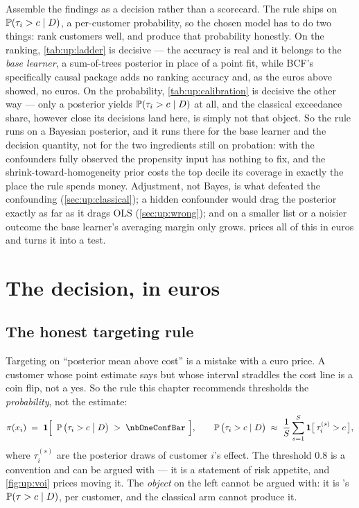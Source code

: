Assemble the findings as a decision rather than a scorecard. The rule ships on
$\operatorname{\mathbb{P}}(\tau_i > c \mid D)$, a per-customer probability, so the chosen model has to do two things:
rank customers well, and produce that probability honestly. On the ranking, \cref{tab:up:ladder} is
decisive --- the accuracy is real and it belongs to the \emph{base learner}, a sum-of-trees
posterior in place of a point fit, while BCF's specifically causal package adds no ranking accuracy
and, as the euros above showed, no euros. On the probability, \cref{tab:up:calibration} is decisive
the other way --- only a posterior yields $\operatorname{\mathbb{P}}(\tau_i > c \mid D)$ at all, and the classical
exceedance share, however close its decisions land here, is simply not that object. So the rule runs
on a Bayesian posterior, and it runs there for the base learner and the decision quantity, not for
the two ingredients still on probation: with the confounders fully observed the propensity input has
nothing to fix, and the shrink-toward-homogeneity prior costs the top decile its coverage in exactly
the place the rule spends money. Adjustment, not Bayes, is what defeated the confounding
(\cref{sec:up:classical}); a hidden confounder would drag the posterior exactly as far as it drags
OLS (\cref{sec:up:wrong}); and on a smaller list or a noisier outcome the base learner's averaging
margin only grows.  prices all of this in euros and turns it into a test.

\section{The decision, in euros}
\label{sec:up:euro}

\subsection*{The honest targeting rule}

Targeting on ``posterior mean above cost'' is a mistake with a euro price. A customer whose point
estimate says  but whose interval straddles the \eur{\nbOneCost} cost line is a coin flip,
not a yes. So the rule this chapter recommends thresholds the \emph{probability}, not the estimate:
%
\begin{equation}
  \pi(x_i) \;=\; \mathbf 1\Big[\ \Prob\big(\tau_i > c \;\big|\; D\big) \;>\; \nbOneConfBar\ \Big],
  \qquad
  \Prob\big(\tau_i > c \mid D\big) \;\approx\; \frac{1}{S}\sum_{s=1}^{S}
      \mathbf 1\big[\,\tau_i^{(s)} > c\,\big],
  \label{eq:up:rule}
\end{equation}
%
where $\tau_i^{(s)}$ are the posterior draws of customer $i$'s effect. The threshold $0.8$ is a
convention and can be argued with --- it is a statement of risk appetite, and
\cref{fig:up:voi} prices moving it. The \emph{object} on the left cannot be argued with: it is
's $\operatorname{\mathbb{P}}(\tau > c \mid D)$, per customer, and the classical arm
cannot produce it.

